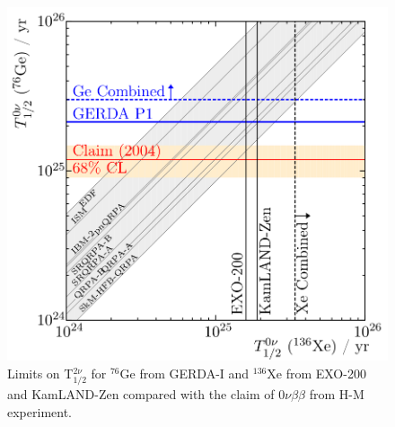 \documentclass[main.tex]{subfiles}
\begin{document}
\begin{figure}[h!]
\begin{center}
\includegraphics[scale=0.30]{pictures/Chap2/Gerda-EXO-combined.png}
\caption{Limits on T$_{\text{1/2}}^{\text{2}\nu}$ for $^{\text{76}}$Ge from GERDA-I and $^{\text{136}}$Xe from EXO-200 and KamLAND-Zen compared with the claim of 0$\nu\beta\beta$ from H-M experiment.}
\label{Gerda-EXO-combined}
\end{center}
\end{figure}
\end{document}
